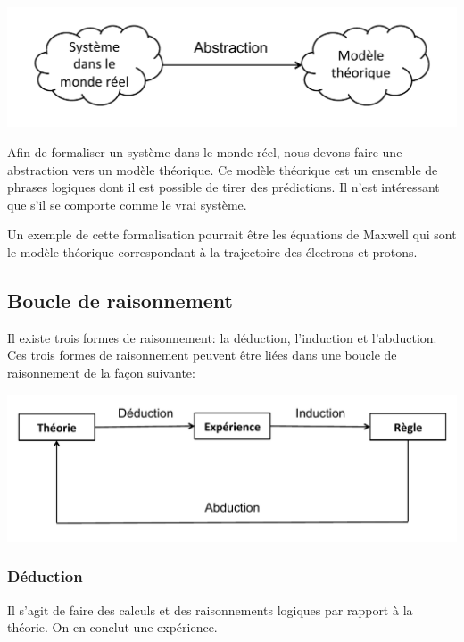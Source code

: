 \begin{center}
\includegraphics[scale=0.65]{images/Abstraction.pdf}
\end{center}

Afin de formaliser un système dans le monde réel, nous devons faire une abstraction vers un modèle théorique. Ce modèle théorique est un ensemble de phrases logiques dont il est possible de tirer des prédictions. Il n'est intéressant que s'il se comporte comme le vrai système.

Un exemple de cette formalisation pourrait être les équations de Maxwell qui sont le modèle théorique correspondant à la trajectoire des électrons et protons.

\subsection{Boucle de raisonnement}

Il existe trois formes de raisonnement: la déduction, l'induction et l'abduction. Ces trois formes de raisonnement peuvent être liées dans une boucle de raisonnement de la façon suivante:

\begin{center}
\includegraphics[scale=0.50]{images/BoucleRaisonnement1.pdf}
\end{center}

\subsubsection{Déduction}

Il s'agit de faire des calculs et des raisonnements logiques par rapport à la théorie. On en conclut une expérience. \\


